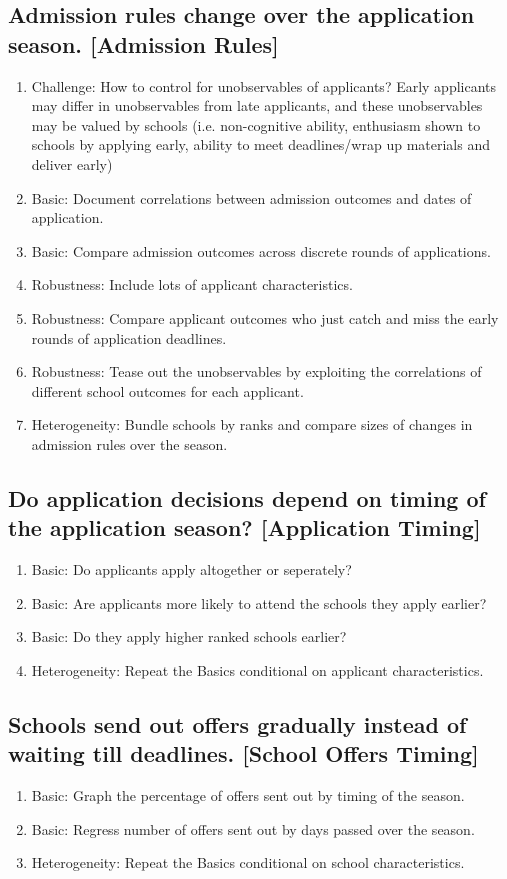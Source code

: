 \documentclass[12pt]{article}
\begin{document}
\subsection{Admission rules change over the application season. [Admission Rules]}
\begin{enumerate}
\item Challenge: How to control for unobservables of applicants?
Early applicants may differ in unobservables from late applicants, and these unobservables may be valued by schools (i.e. non-cognitive ability, enthusiasm shown to schools by applying early, ability to meet deadlines/wrap up materials and deliver early)
\item Basic: Document correlations between admission outcomes and dates of application. 
\item Basic: Compare admission outcomes across discrete rounds of applications.
\item Robustness: Include lots of applicant characteristics.
\item Robustness: Compare applicant outcomes who just catch and miss the early rounds of application deadlines.
\item Robustness: Tease out the unobservables by exploiting the correlations of different school outcomes for each applicant. 
\item Heterogeneity: Bundle schools by ranks and compare sizes of changes in admission rules over the season.
\end{enumerate}

\subsection{Do application decisions depend on timing of the application season? [Application Timing]}
\begin{enumerate}
\item Basic: Do applicants apply altogether or seperately?
\item Basic: Are applicants more likely to attend the schools they apply earlier?
\item Basic: Do they apply higher ranked schools earlier? 
\item Heterogeneity: Repeat the Basics conditional on applicant characteristics.
\end{enumerate}

\subsection{Schools send out offers gradually instead of waiting till deadlines. [School Offers Timing]}
\begin{enumerate}
\item Basic: Graph the percentage of offers sent out by timing of the season.
\item Basic: Regress number of offers sent out by days passed over the season.
\item Heterogeneity: Repeat the Basics conditional on school characteristics.
\end{enumerate}
\end{document}
